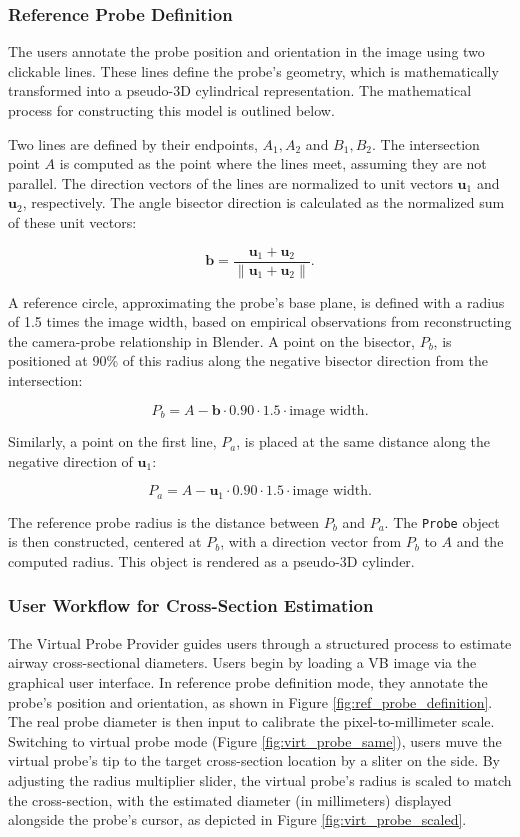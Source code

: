 \subsubsection{Reference Probe Definition}
The users annotate the probe position and orientation in the image using two clickable lines. These lines define the probe’s geometry, which is mathematically transformed into a pseudo-3D cylindrical representation. The mathematical process for constructing this model is outlined below.

Two lines are defined by their endpoints, \( A_1, A_2 \) and \( B_1, B_2 \). The intersection point \( A \) is computed as the point where the lines meet, assuming they are not parallel. The direction vectors of the lines are normalized to unit vectors \( \mathbf{u}_1 \) and \( \mathbf{u}_2 \), respectively. The angle bisector direction is calculated as the normalized sum of these unit vectors:

\[
\mathbf{b} = \frac{\mathbf{u}_1 + \mathbf{u}_2}{\|\mathbf{u}_1 + \mathbf{u}_2\|}.
\]

A reference circle, approximating the probe’s base plane, is defined with a radius of 1.5 times the image width, based on empirical observations from reconstructing the camera-probe relationship in Blender. A point on the bisector, \( P_b \), is positioned at 90\% of this radius along the negative bisector direction from the intersection:

\[
P_b = A - \mathbf{b} \cdot 0.90 \cdot 1.5 \cdot \text{image width}.
\]

Similarly, a point on the first line, \( P_a \), is placed at the same distance along the negative direction of \( \mathbf{u}_1 \):

\[
P_a = A - \mathbf{u}_1 \cdot 0.90 \cdot 1.5 \cdot \text{image width}.
\]

The reference probe radius is the distance between \( P_b \) and \( P_a \). The \texttt{Probe} object is then constructed, centered at \( P_b \), with a direction vector from \( P_b \) to \( A \) and the computed radius. This object is rendered as a pseudo-3D cylinder.


\subsubsection{User Workflow for Cross-Section Estimation}

The Virtual Probe Provider guides users through a structured process to estimate airway cross-sectional diameters. Users begin by loading a VB image via the graphical user interface. In reference probe definition mode, they annotate the probe’s position and orientation, as shown in Figure \ref{fig:ref_probe_definition}. The real probe diameter is then input to calibrate the pixel-to-millimeter scale. Switching to virtual probe mode (Figure \ref{fig:virt_probe_same}), users muve the virtual probe’s tip to the target cross-section location by a sliter on the side. By adjusting the radius multiplier slider, the virtual probe’s radius is scaled to match the cross-section, with the estimated diameter (in millimeters) displayed alongside the probe’s cursor, as depicted in Figure \ref{fig:virt_probe_scaled}.

